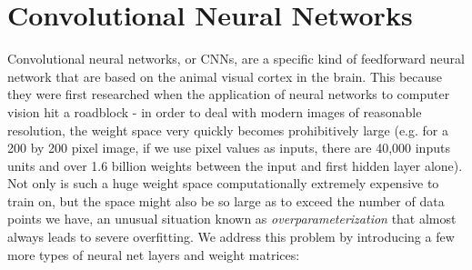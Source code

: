 \documentclass{article}
\begin{document}
\section{Convolutional Neural Networks}
Convolutional neural networks, or CNNs, are a specific kind of feedforward neural network that are based on the animal visual cortex in the brain. This because they were first researched when the application of neural networks to computer vision hit a roadblock - in order to deal with modern images of reasonable resolution, the weight space very quickly becomes prohibitively large (e.g. for a 200 by 200 pixel image, if we use pixel values as inputs, there are 40,000 inputs units and over 1.6 billion weights between the input and first hidden layer alone). Not only is such a huge weight space computationally extremely expensive to train on, but the space might also be so large as to exceed the number of data points we have, an unusual situation known as \textit{overparameterization} that almost always leads to severe overfitting. We address this problem by introducing a few more types of neural net layers and weight matrices:
\end{document}
